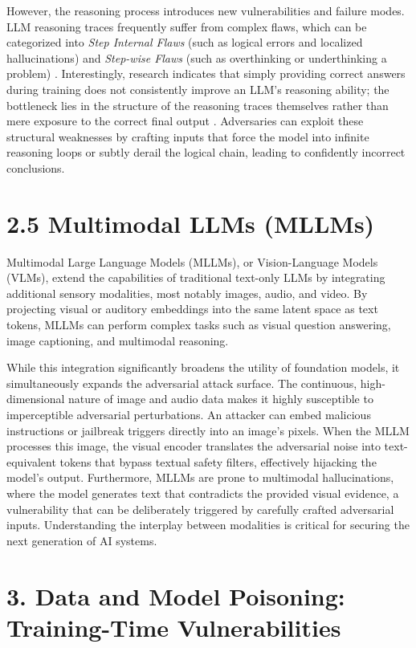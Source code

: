 \documentclass[11pt,a4paper]{article}
\begin{document}
However, the reasoning process introduces new vulnerabilities and failure modes. LLM reasoning traces frequently suffer from complex flaws, which can be categorized into \textit{Step Internal Flaws} (such as logical errors and localized hallucinations) and \textit{Step-wise Flaws} (such as overthinking or underthinking a problem) . Interestingly, research indicates that simply providing correct answers during training does not consistently improve an LLM's reasoning ability; the bottleneck lies in the structure of the reasoning traces themselves rather than mere exposure to the correct final output . Adversaries can exploit these structural weaknesses by crafting inputs that force the model into infinite reasoning loops or subtly derail the logical chain, leading to confidently incorrect conclusions.

\section{2.5 Multimodal LLMs (MLLMs)}

Multimodal Large Language Models (MLLMs), or Vision-Language Models (VLMs), extend the capabilities of traditional text-only LLMs by integrating additional sensory modalities, most notably images, audio, and video. By projecting visual or auditory embeddings into the same latent space as text tokens, MLLMs can perform complex tasks such as visual question answering, image captioning, and multimodal reasoning.

While this integration significantly broadens the utility of foundation models, it simultaneously expands the adversarial attack surface. The continuous, high-dimensional nature of image and audio data makes it highly susceptible to imperceptible adversarial perturbations. An attacker can embed malicious instructions or jailbreak triggers directly into an image's pixels. When the MLLM processes this image, the visual encoder translates the adversarial noise into text-equivalent tokens that bypass textual safety filters, effectively hijacking the model's output. Furthermore, MLLMs are prone to multimodal hallucinations, where the model generates text that contradicts the provided visual evidence, a vulnerability that can be deliberately triggered by carefully crafted adversarial inputs. Understanding the interplay between modalities is critical for securing the next generation of AI systems.

\section{3. Data and Model Poisoning: Training-Time Vulnerabilities}
\end{document}
